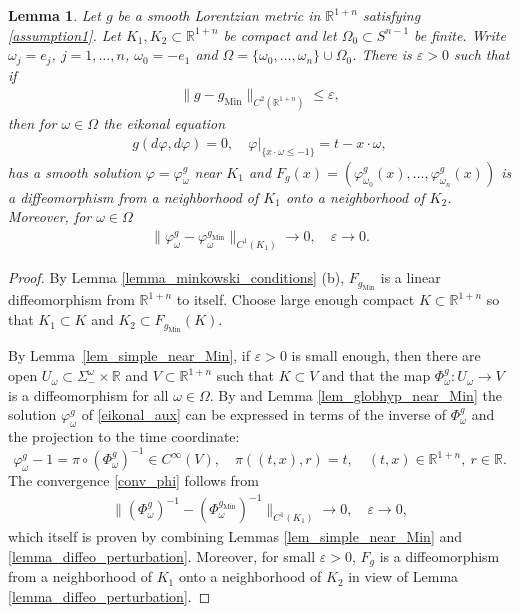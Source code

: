 \documentclass[11pt,letterpaper]{amsart}
\newtheorem{Lemma}[Theorem]{Lemma}
\theoremstyle{definition}
\numberwithin{equation}{section}
\newcommand{\mR}{\mathbb{R}}                    %
\newcommand{\norm}[1]{\lVert #1 \rVert}         %
\newcommand{\eps}{\varepsilon}
\newcommand{\gm}{g_{\mathrm{Min}}}
\def\R{\mathbb R}
\begin{document}
\begin{Lemma}\label{lem_diffeo_near_Min}
Let $g$ be a smooth Lorentzian metric in $\mR^{1+n}$ satisfying \eqref{assumption1}. Let $K_1, K_2 \subset \R^{1+n}$ be compact and let $\Omega_0 \subset S^{n-1}$ be finite. 
Write $\omega_j = e_j$, $j = 1,\dots,n$, $\omega_0 = -e_1$ and $\Omega = \{\omega_0, \dots, \omega_n\} \cup \Omega_0$.
There is $\eps > 0$ such that if
\begin{gather*}
\norm{g-\gm}_{C^2(\R^{1+n})} \le \eps,
\end{gather*}
then for $\omega \in \Omega$ the eikonal equation 
    \begin{align}\label{eikonal_aux}
g(d\varphi, d\varphi) = 0, \quad \varphi|_{\{ x \cdot \omega \leq -1 \}} = t-x \cdot \omega,
    \end{align}
has a smooth solution $\varphi = \varphi_{\omega}^g$ near $K_1$ and 
$F_g(x) = (\varphi_{\omega_0}^g(x), \dots, \varphi_{\omega_n}^g(x))$ is a diffeomorphism from a neighborhood of $K_1$ onto a neighborhood of $K_2$. Moreover, for $\omega \in \Omega$  
    \begin{align}\label{conv_phi}
\norm{\varphi_{\omega}^g - \varphi_{\omega}^{\gm}}_{C^1(K_1)} \to 0, \quad \eps \to 0.
    \end{align}
\end{Lemma}
\begin{proof}
By Lemma \ref{lemma_minkowski_conditions} (b), $F_{\gm}$ is a linear diffeomorphism from $\R^{1+n}$ to itself. Choose large enough compact $K \subset \R^{1+n}$ so that $K_1 \subset K$ and $K_2 \subset F_{\gm}(K)$. 

By Lemma~\ref{lem_simple_near_Min}, if $\eps > 0$ is small enough, then there are open $U_\omega \subset \Sigma_-^\omega \times \R$ and $V \subset \R^{1+n}$ such that $K \subset V$ and that the map $\Phi_\omega^g : U_\omega \to V$ is a diffeomorphism for all $\omega \in \Omega$. By \cite[Proposition 4.1]{oksanen2024} and Lemma \ref{lem_globhyp_near_Min}
the solution $\varphi_\omega^g$ of \eqref{eikonal_aux} can be expressed in terms of the inverse of $\Phi_\omega^g$ and the projection to the time coordinate: 
\[
\varphi_\omega^g - 1 = \pi \circ (\Phi_\omega^g)^{-1} \in C^\infty(V),
\quad 
\pi((t, x), r) = t, \quad (t, x) \in \R^{1+n},\ r \in \R.
\]
The convergence \eqref{conv_phi} follows from 
    \begin{align*}
\norm{(\Phi_\omega^g)^{-1} - (\Phi_\omega^{\gm})^{-1}}_{C^1(K_1)} \to 0, \quad \eps \to 0,
    \end{align*}
which itself is proven by combining Lemmas \ref{lem_simple_near_Min} and \ref{lemma_diffeo_perturbation}. Moreover, for small $\eps > 0$, $F_g$ is a diffeomorphism from a neighborhood of $K_1$ onto a neighborhood of $K_2$ in view of Lemma \ref{lemma_diffeo_perturbation}.
\end{proof}
\end{document}
